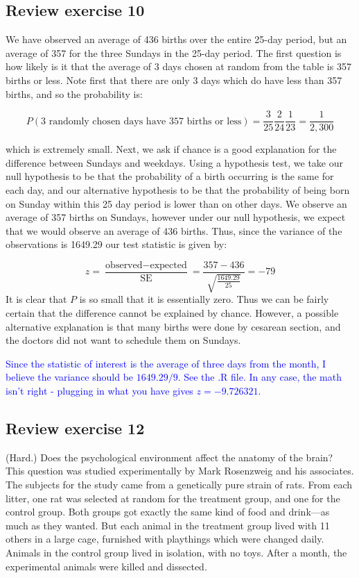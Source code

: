 \documentclass[11pt]{article}
\begin{document}
\subsection*{Review exercise 10} %

We have observed an average of 436 births over the entire 25-day period, but an average of 357 for the three Sundays in the 25-day period. The first question is how likely is it that the average of 3 days chosen at random from the table is 357 births or less. Note first that there are only 3 days which do have less than 357 births, and so the probability is:

$$P(\text{3 randomly chosen days have 357 births or less}) = \frac{3}{25}\frac{2}{24}\frac{1}{23} = \frac{1}{2,300}$$

\noindent which is extremely small. Next, we ask if chance is a good explanation for the difference between Sundays and weekdays. Using a hypothesis test, we take our null hypothesis to be that the probability of a birth occurring is the same for each day, and our alternative hypothesis to be that the probability of being born on Sunday within this 25 day period is lower than on other days. We observe an average of 357 births on Sundays, however under our null hypothesis, we expect that we would observe an average of 436 births. Thus, since the variance of the observations is 1649.29 our test statistic is given by:

$$z = \frac{\text{observed} - \text{expected}}{\text{SE}} = \frac{357 - 436}{\sqrt{\frac{1649.29}{25}}} = -79 $$
It is clear that $P$ is so small that it is essentially zero. Thus we can be fairly certain that the difference cannot be explained by chance. However, a possible alternative explanation is that many births were done by cesarean section, and the doctors did not want to schedule them on Sundays.

\textcolor{blue}{ Since the statistic of interest is the average of three days from the month, I believe the variance should be $1649.29/9$.  See the .R file.  In any case, the math isn't right - plugging in what you have gives $z=-9.726321$.} %



\subsection*{Review exercise 12} %
(Hard.) Does the psychological environment affect the anatomy of the brain?
This question was studied experimentally by Mark Rosenzweig and his associates.
The subjects for the study came from a genetically pure strain of rats.
From each litter, one rat was selected at random for the treatment group, and one for the control group.
Both groups got exactly the same kind of food and drink---as much as they wanted.
But each animal in the treatment group lived with 11 others in a large cage, furnished with playthings which were changed daily.
Animals in the control group lived in isolation, with no toys.
After a month, the experimental animals were killed and dissected.
\end{document}
